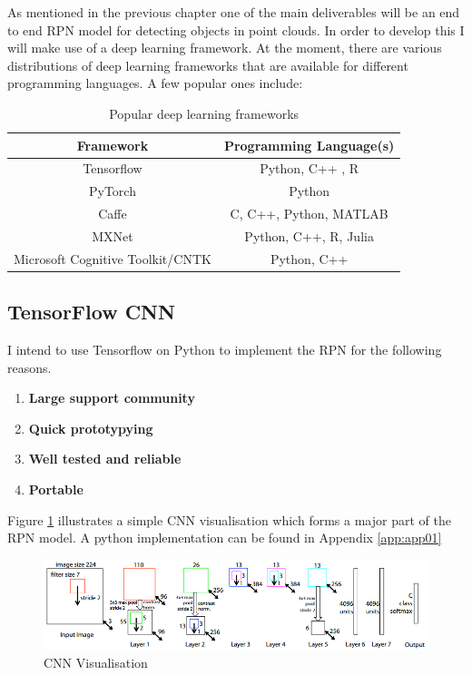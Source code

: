  As mentioned in the previous chapter one of the main deliverables will be an end to end RPN model for detecting objects in point clouds. In order to develop this I will make use of a deep learning framework. 
At the moment, there are various distributions of deep learning frameworks that are available for different programming languages. 
A few popular ones include:
\begin{table}[H]
	\centering
	\begin{tabular}{|c|c|}
		\hline
		Framework & Programming Language(s)  \\ \hline
		Tensorflow &  Python, C++ , R  \\ \hline
		PyTorch & Python  \\ \hline
		Caffe & C, C++, Python, MATLAB \\ \hline
		MXNet & Python, C++, R, Julia \\ \hline
		Microsoft Cognitive Toolkit/CNTK & Python, C++ \\ \hline
		
	\end{tabular}
	\caption{Popular deep learning frameworks}
	\label{table:dlframeworks}
\end{table}

\subsection{TensorFlow CNN}
I intend to use Tensorflow on Python to implement the RPN for the following reasons.
\begin{enumerate}
	\item \textbf{Large support community }
	\item \textbf{Quick prototypying}
	\item \textbf{Well tested and reliable}
	\item \textbf{Portable}
\end{enumerate}
Figure \ref{ fig:cnn_vis} illustrates a simple CNN visualisation which forms a major part of the RPN model.  A python implementation  can be found in Appendix \ref{app:app01}

\begin{figure}[h]
	\centering
	\includegraphics[width=\textwidth]{media/cnn.png}
	\caption{CNN Visualisation \cite{zeiler2014visualizing}}
	\label{ fig:cnn_vis}
\end{figure}






